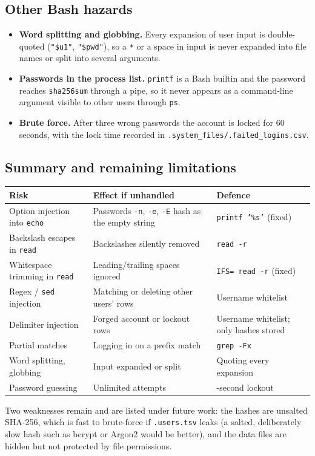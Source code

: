 \documentclass[12pt]{article}
\begin{document}
\subsection{Other Bash hazards}
\begin{itemize}
    \item \textbf{Word splitting and globbing.} Every expansion of user input is double-quoted (\texttt{"\$u1"}, \texttt{"\$pwd"}), so a \texttt{*} or a space in input is never expanded into file names or split into several arguments.
    \item \textbf{Passwords in the process list.} \texttt{printf} is a Bash builtin and the password reaches \texttt{sha256sum} through a pipe, so it never appears as a command-line argument visible to other users through \texttt{ps}.
    \item \textbf{Brute force.} After three wrong passwords the account is locked for 60 seconds, with the lock time recorded in \texttt{.system\_files/.failed\_logins.csv}.
\end{itemize}

\subsection{Summary and remaining limitations}
\begin{center}
\small
\begin{tabularx}{\textwidth}{>{\raggedright\arraybackslash}p{4.2cm} >{\raggedright\arraybackslash}X >{\raggedright\arraybackslash}p{3.6cm}}
\toprule
\textbf{Risk} & \textbf{Effect if unhandled} & \textbf{Defence} \\
\midrule
Option injection into \texttt{echo} & Passwords \texttt{-n}, \texttt{-e}, \texttt{-E} hash as the empty string & \texttt{printf '\%s'} (fixed) \\
Backslash escapes in \texttt{read} & Backslashes silently removed & \texttt{read -r} \\
Whitespace trimming in \texttt{read} & Leading/trailing spaces ignored & \texttt{IFS= read -r} (fixed) \\
Regex / \texttt{sed} injection & Matching or deleting other users' rows & Username whitelist \\
Delimiter injection & Forged account or lockout rows & Username whitelist; only hashes stored \\
Partial matches & Logging in on a prefix match & \texttt{grep -Fx} \\
Word splitting, globbing & Input expanded or split & Quoting every expansion \\
Password guessing & Unlimited attempts & 60-second lockout \\
\bottomrule
\end{tabularx}
\end{center}
Two weaknesses remain and are listed under future work: the hashes are unsalted SHA-256, which is fast to brute-force if \texttt{.users.tsv} leaks (a salted, deliberately slow hash such as bcrypt or Argon2 would be better), and the data files are hidden but not protected by file permissions.
\end{document}
